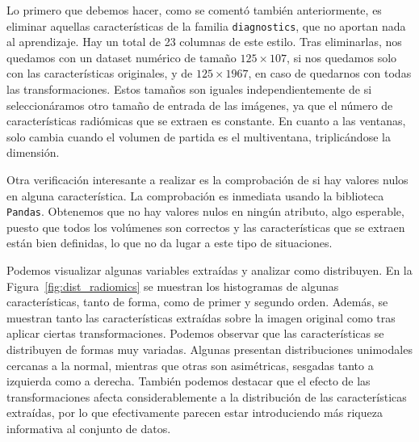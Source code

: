 Lo primero que debemos hacer, como se comentó también anteriormente, es eliminar aquellas características de la familia \texttt{diagnostics}, que no aportan nada al aprendizaje. Hay un total de 23 columnas de este estilo. Tras eliminarlas, nos quedamos con un dataset numérico de tamaño $125 \times 107$, si nos quedamos solo con las características originales, y de $125 \times 1967$, en caso de quedarnos con todas las transformaciones. Estos tamaños son iguales independientemente de si seleccionáramos otro tamaño de entrada de las imágenes, ya que el número de características radiómicas que se extraen es constante. En cuanto a las ventanas, solo cambia cuando el volumen de partida es el multiventana, triplicándose la dimensión.

Otra verificación interesante a realizar es la comprobación de si hay valores nulos en alguna característica. La comprobación es inmediata usando la biblioteca \texttt{Pandas}. Obtenemos que no hay valores nulos en ningún atributo, algo esperable, puesto que todos los volúmenes son correctos y las características que se extraen están bien definidas, lo que no da lugar a este tipo de situaciones.

Podemos visualizar algunas variables extraídas y analizar como distribuyen. En la Figura~\ref{fig:dist_radiomics} se muestran los histogramas de algunas características, tanto de forma, como de primer y segundo orden. Además, se muestran tanto las características extraídas sobre la imagen original como tras aplicar ciertas transformaciones. Podemos observar que las características se distribuyen de formas muy variadas. Algunas presentan distribuciones unimodales cercanas a la normal, mientras que otras son asimétricas, sesgadas tanto a izquierda como a derecha. También podemos destacar que el efecto de las transformaciones afecta considerablemente a la distribución de las características extraídas, por lo que efectivamente parecen estar introduciendo más riqueza informativa al conjunto de datos.




